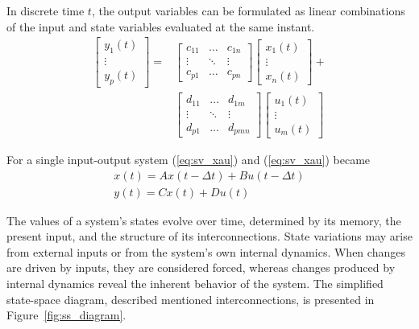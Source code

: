 In discrete time $t$, the output variables can be formulated as linear combinations of the input and state variables evaluated at the same instant.
\begin{equation}
    \begin{aligned}
{\left[\begin{array}{c}
y_{1}(t) \\
\vdots \\
y_{p}(t)
\end{array}\right]=} & {\left[\begin{array}{ccc}
c_{11} & \ldots & c_{1 n} \\
\vdots & \ddots & \vdots \\
c_{p 1} & \ldots & c_{p n}
\end{array}\right]\left[\begin{array}{c}
x_{1}(t) \\
\vdots \\
x_{n}(t)
\end{array}\right]+} \\
& {\left[\begin{array}{ccc}
d_{11} & \ldots & d_{1 m} \\
\vdots & \ddots & \vdots \\
d_{p 1} & \ldots & d_{p m n}
\end{array}\right]\left[\begin{array}{c}
u_{1}(t) \\
\vdots \\
u_{m}(t)
\end{array}\right] }
\end{aligned}
\label{eq:sv_ycd}
\end{equation}

For a single input-output system (\ref{eq:sv_xau}) and (\ref{eq:sv_xau}) became
\begin{equation}
    \begin{array}{l}
x(t)=A x(t-\Delta t)+B u(t-\Delta t) \\
y(t)=C x(t)+D u(t)
\end{array}
\end{equation}

The values of a system’s states evolve over time, determined by its memory, the present input, and the structure of its interconnections. State variations may arise from external inputs or from the system’s own internal dynamics. When changes are driven by inputs, they are considered forced, whereas changes produced by internal dynamics reveal the inherent behavior of the system. The simplified state-space diagram, described mentioned interconnections, is presented in Figure~\cref{fig:ss_diagram}.  


